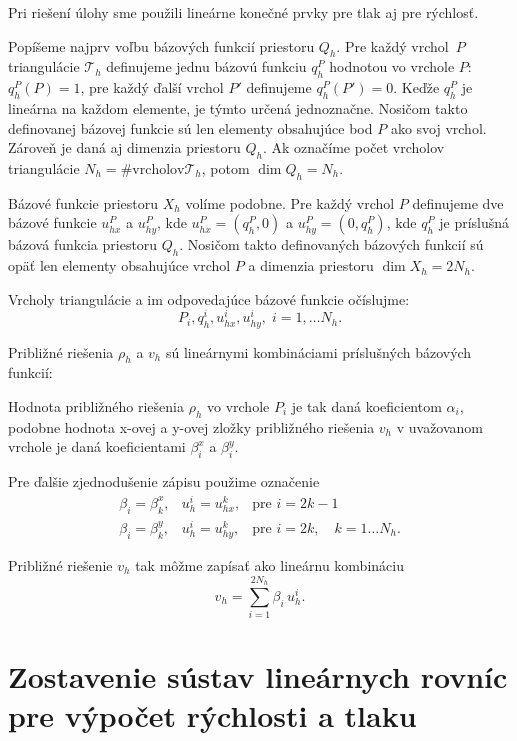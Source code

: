 Pri riešení úlohy sme použili lineárne konečné prvky pre tlak aj pre rýchlosť.

Popíšeme najprv voľbu bázových funkcií priestoru $Q_h$. Pre každý vrchol~$P$
triangulácie $\mathcal T_h$ definujeme jednu bázovú funkciu $q_h^P$ hodnotou vo
vrchole $P$: $q_h^P(P) = 1$, pre každý ďalší vrchol $P'$ definujeme
$q_h^P(P') = 0$. Keďže $q_h^P$ je lineárna na každom elemente, je týmto určená jednoznačne. 
Nosičom takto definovanej bázovej funkcie sú len elementy obsahujúce bod $P$ ako
svoj vrchol. Zároveň je daná aj dimenzia priestoru $Q_h$. Ak označíme počet vrcholov
triangulácie $N_h = \# \mbox{vrcholov} \mathcal T_h$, potom $\dim Q_h = N_h$.

Bázové funkcie priestoru $X_h$ volíme podobne. Pre každý vrchol $P$ definujeme
dve bázové funkcie $u_{hx}^P$ a $u_{hy}^P$, kde $u_{hx}^P = (q_h^P,0)$ a 
$u_{hy}^P = (0,q_h^P)$, kde $q_h^P$ je príslušná bázová funkcia priestoru $Q_h$.
Nosičom takto definovaných bázových funkcií sú opäť len elementy obsahujúce
vrchol $P$ a dimenzia priestoru $\dim X_h = 2N_h$.

Vrcholy triangulácie a im odpovedajúce bázové funkcie očíslujme:
$$P_i,q_h^i,u_{hx}^i,u_{hy}^i,\;i=1,\ldots N_h.$$

Približné riešenia $\rho_h$ a $v_h$ sú lineárnymi kombináciami príslušných bázových
funkcií: 

Hodnota približného riešenia $\rho_h$ vo vrchole $P_i$ je tak daná koeficientom
$\alpha_i$, podobne hodnota x-ovej a y-ovej zložky približného riešenia $v_h$ v
uvažovanom vrchole je daná koeficientami $\beta_i^x$ a $\beta_i^y$.

Pre ďalšie zjednodušenie zápisu použime označenie
\[
\begin{array}{lll}
\beta_i=\beta_k^x, & u_h^i=u_{hx}^k, & \mbox{pre } i=2k-1 \\
\beta_i=\beta_k^y, & u_h^i=u_{hy}^k, & \mbox{pre } i=2k, \quad k=1\ldots N_h.
\end{array}
\]

Približné riešenie $v_h$ tak môžme zapísať ako lineárnu kombináciu
$$v_h = \sum_{i=1}^{2N_h} \beta_i \, u_h^i.$$

\section{Zostavenie sústav lineárnych rovníc pre výpočet rýchlosti a tlaku}

